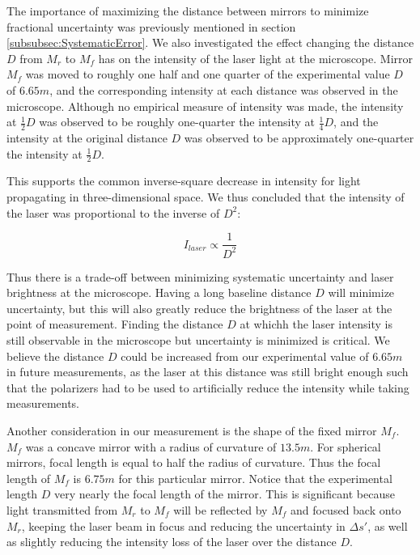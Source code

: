 \documentclass[twocolumn]{article}
\begin{document}
		The importance of maximizing the distance between mirrors to minimize fractional uncertainty was previously mentioned in section \ref{subsubsec:SystematicError}.
		We also investigated the effect changing the distance $D$ from $M_r$ to $M_f$ has on the intensity of the laser light at the microscope.
		Mirror $M_f$ was moved to roughly one half and one quarter of the experimental value $D$ of $6.65m$, and the corresponding intensity at each distance was observed in the microscope. Although no empirical measure of intensity was made, the intensity at $\frac{1}{2}D$ was observed to be roughly one-quarter the intensity at $\frac{1}{4}D$, and the intensity at the original distance $D$ was observed to be approximately one-quarter the intensity at $\frac{1}{2}D$.
		
		This supports the common inverse-square decrease in intensity for light propagating in three-dimensional space.
		We thus concluded that the intensity of the laser was proportional to the inverse of $D^2$:
		
		\begin{equation}
			I_{laser} \propto \frac{1}{D^2}
		\end{equation}
		
		Thus there is a trade-off between minimizing systematic uncertainty and laser brightness at the microscope.
		Having a long baseline distance $D$ will minimize uncertainty, but this will also greatly reduce the brightness of the laser at the point of measurement.
		Finding the distance $D$ at whichh the laser intensity is still observable in the microscope but uncertainty is minimized is critical.
		We believe the distance $D$ could be increased from our experimental value of $6.65m$ in future measurements, as the laser at this distance was still bright enough such that the polarizers had to be used to artificially reduce the intensity while taking measurements.
		
		Another consideration in our measurement is the shape of the fixed mirror $M_f$. 
		$M_f$ was a concave mirror with a radius of curvature of $13.5m$. 
		For spherical mirrors, focal length is equal to half the radius of curvature. 
		Thus the focal length of $M_f$ is $6.75m$ for this particular mirror. 
		Notice that the experimental length $D$ very nearly the focal length of the mirror.
		This is significant because light transmitted from $M_r$ to $M_f$ will be reflected by $M_f$ and focused back onto $M_r$, keeping the laser beam in focus and reducing the uncertainty in $\Delta s'$, as well as slightly reducing the intensity loss of the laser over the distance $D$.
		
\end{document}
